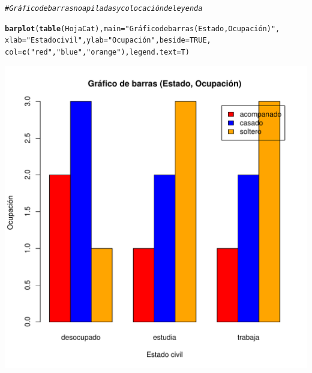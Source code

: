\documentclass[12pt,letterpaper]{article}\usepackage[]{graphicx}\usepackage[]{color}
\makeatletter
\def\maxwidth{ %
  \ifdim\Gin@nat@width>\linewidth
    \linewidth
  \else
    \Gin@nat@width
  \fi
}
\newcommand{\hlnum}[1]{\textcolor[rgb]{0.686,0.059,0.569}{#1}}%
\newcommand{\hlstr}[1]{\textcolor[rgb]{0.192,0.494,0.8}{#1}}%
\newcommand{\hlcom}[1]{\textcolor[rgb]{0.678,0.584,0.686}{\textit{#1}}}%
\newcommand{\hlstd}[1]{\textcolor[rgb]{0.345,0.345,0.345}{#1}}%
\newcommand{\hlkwc}[1]{\textcolor[rgb]{0.333,0.667,0.333}{#1}}%
\newcommand{\hlkwd}[1]{\textcolor[rgb]{0.737,0.353,0.396}{\textbf{#1}}}%
\newenvironment{kframe}{%
 \def\at@end@of@kframe{}%
 \ifinner\ifhmode%
  \def\at@end@of@kframe{\end{minipage}}%
  \begin{minipage}{\columnwidth}%
 \fi\fi%
 \def\FrameCommand##1{\hskip\@totalleftmargin \hskip-\fboxsep
 \colorbox{shadecolor}{##1}\hskip-\fboxsep
     \hskip-\linewidth \hskip-\@totalleftmargin \hskip\columnwidth}%
 \MakeFramed {\advance\hsize-\width
   \@totalleftmargin\z@ \linewidth\hsize
   \@setminipage}}%
 {\par\unskip\endMakeFramed%
 \at@end@of@kframe}
\newenvironment{knitrout}{}{} %
\makeatother
\begin{document}
\begin{enumerate}
\begin{knitrout}
\color{fgcolor}\begin{kframe}
\begin{alltt}
\hlcom{# Gráfico de barras no apiladas y colocación de leyenda}

\hlkwd{barplot}\hlstd{(}\hlkwd{table}\hlstd{(HojaCat),} \hlkwc{main}\hlstd{=}\hlstr{"Gráfico de barras (Estado, Ocupación)"}\hlstd{,}
        \hlkwc{xlab} \hlstd{=} \hlstr{"Estado civil"}\hlstd{,}  \hlkwc{ylab}\hlstd{=}\hlstr{"Ocupación"}\hlstd{,} \hlkwc{beside}\hlstd{=}\hlnum{TRUE}\hlstd{,}
        \hlkwc{col}\hlstd{=}\hlkwd{c}\hlstd{(}\hlstr{"red"}\hlstd{,} \hlstr{"blue"}\hlstd{,} \hlstr{"orange"}\hlstd{),} \hlkwc{legend.text}\hlstd{=T)}
\end{alltt}
\end{kframe}
\includegraphics[width=\maxwidth]{figure/unnamed-chunk-18-1} 

\end{knitrout}


\end{enumerate}
\end{document}
